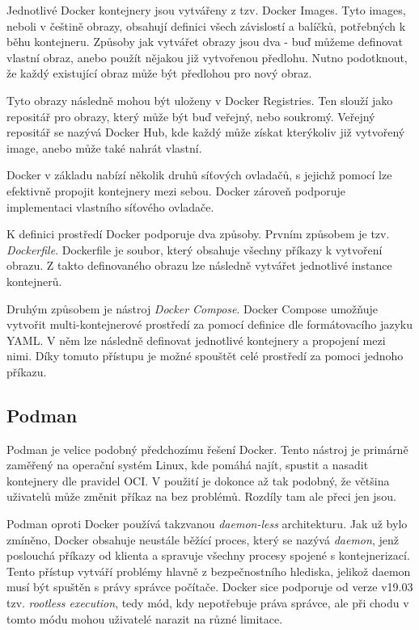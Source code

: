 Jednotlivé Docker kontejnery jsou vytvářeny z tzv. Docker Images. Tyto images, neboli v češtině obrazy, obsahují definici všech závislostí a balíčků, potřebných k běhu kontejneru. Způsoby jak vytvářet obrazy jsou dva - buď můžeme definovat vlastní obraz, anebo použít nějakou již vytvořenou předlohu. Nutno podotknout, že každý existující obraz může být předlohou pro nový obraz.\,\cite{turnbull2014docker}

Tyto obrazy následně mohou být uloženy v Docker Registries. Ten slouží jako repositář pro obrazy, který může být buď veřejný, nebo soukromý. Veřejný repositář se nazývá Docker Hub\cite{docker_hub}, kde každý může získat kterýkoliv již vytvořený image, anebo může také nahrát vlastní.\,\cite{turnbull2014docker} 

Docker v základu nabízí několik druhů síťových ovladačů, s jejichž pomocí lze efektivně propojit kontejnery mezi sebou. Docker zároveň podporuje implementaci vlastního síťového ovladače.\,\cite{docker_networking_overview}

K definici prostředí Docker podporuje dva způsoby. Prvním způsobem je tzv. \textit{Dockerfile}. Dockerfile je soubor, který obsahuje všechny příkazy k vytvoření obrazu. Z takto definovaného obrazu lze následně vytvářet jednotlivé instance kontejnerů.\,\cite{dockerfile}

Druhým způsobem je nástroj \textit{Docker Compose}. Docker Compose umožňuje vytvořit multi-kontejnerové prostředí za pomocí definice dle formátovacího jazyku YAML. V něm lze následně definovat jednotlivé kontejnery a propojení mezi nimi. Díky tomuto přístupu je možné spouštět celé prostředí za pomoci jednoho příkazu.\,\cite{dockercompose}


\subsection{Podman}
Podman je velice podobný předchozímu řešení Docker. Tento nástroj je primárně zaměřený na operační systém Linux, kde pomáhá najít, spustit a nasadit kontejnery dle pravidel OCI. V použití je dokonce až tak podobný, že většina uživatelů může změnit příkaz  na  bez problémů. Rozdíly tam ale přeci jen jsou.\,\cite{podman}\cite{podman_vs_docker}

Podman oproti Docker používá takzvanou \textit{daemon-less} architekturu. Jak už bylo zmíněno, Docker obsahuje neustále běžící proces, který se nazývá \textit{daemon}, jenž poslouchá příkazy od klienta a spravuje všechny procesy spojené s kontejnerizací. Tento přístup vytváří problémy hlavně z bezpečnostního hlediska, jelikož daemon musí být spuštěn s právy správce počítače. Docker sice podporuje od verze v19.03 tzv. \textit{rootless execution}, tedy mód, kdy nepotřebuje práva správce, ale při chodu v tomto módu mohou uživatelé narazit na různé limitace.\,\cite{podman_vs_docker}

